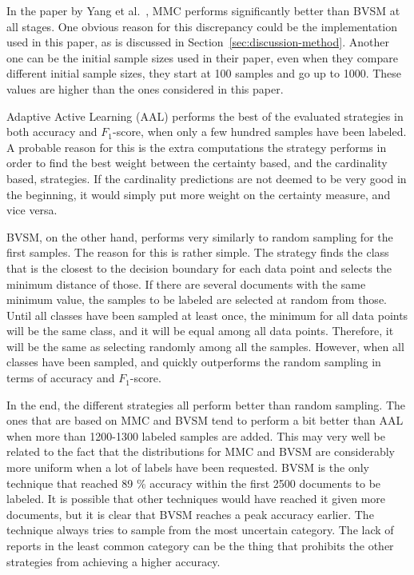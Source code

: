 In the paper by Yang et al\@.~\cite{yang2009effective}, MMC performs significantly better than BVSM at all stages.
One obvious reason for this discrepancy could be the implementation used in this paper, as is discussed in Section~\ref{sec:discussion-method}.
Another one can be the initial sample sizes used in their paper, even when they compare different initial sample sizes, they start at 100 samples and go up to 1000.
These values are higher than the ones considered in this paper.

Adaptive Active Learning (AAL) performs the best of the evaluated strategies in both accuracy and $F_1$-score, when only a few hundred samples have been labeled. 
A probable reason for this is the extra computations the strategy performs in order to find the best weight between the certainty based, and the cardinality based, strategies.
If the cardinality predictions are not deemed to be very good in the beginning, it would simply put more weight on the certainty measure, and vice versa.

BVSM, on the other hand, performs very similarly to random sampling for the first samples.
The reason for this is rather simple.
The strategy finds the class that is the closest to the decision boundary for each data point and selects the minimum distance of those.
If there are several documents with the same minimum value, the samples to be labeled are selected at random from those.
Until all classes have been sampled at least once, the minimum for all data points will be the same class, and it will be equal among all data points.
Therefore, it will be the same as selecting randomly among all the samples.
However, when all classes have been sampled, and quickly outperforms the random sampling in terms of accuracy and $F_1$-score.

In the end, the different strategies all perform better than random sampling.
The ones that are based on MMC and BVSM tend to perform a bit better than AAL when more than 1200-1300 labeled samples are added.
This may very well be related to the fact that the distributions for MMC and BVSM are considerably more uniform when a lot of labels have been requested.
BVSM is the only technique that reached 89 \% accuracy within the first 2500 documents to be labeled.
It is possible that other techniques would have reached it given more documents, but it is clear that BVSM reaches a peak accuracy earlier.
The technique always tries to sample from the most uncertain category.
The lack of reports in the least common category can be the thing that prohibits the other strategies from achieving a higher accuracy.

